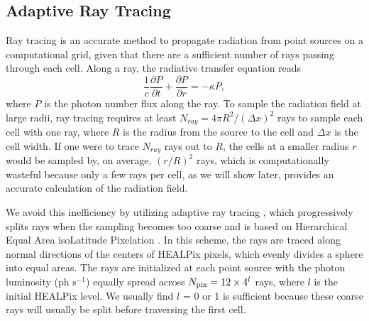 \documentclass[useAMS,usenatbib]{mn2e}
\begin{document}


\subsection{Adaptive Ray Tracing}
\label{sec:ART}

Ray tracing is an accurate method to propagate radiation from point
sources on a computational grid, given that there are a sufficient
number of rays passing through each cell.  Along a ray, the radiative
transfer equation reads
%
\begin{equation}
\label{eqn:rtray}
\frac{1}{c} \frac{\partial P}{\partial t} + \frac{\partial P}{\partial
  r} = -\kappa P,
\end{equation}
%
where $P$ is the photon number flux along the ray.  To sample the
radiation field at large radii, ray tracing requires at least $N_{ray}
= 4\pi R^2 / (\Delta x)^2$ rays to sample each cell with one ray,
where $R$ is the radius from the source to the cell and $\Delta x$ is
the cell width.  If one were to trace $N_{ray}$ rays out to $R$, the
cells at a smaller radius $r$ would be sampled by, on average,
$(r/R)^2$ rays, which is computationally wasteful because only a few
rays per cell, as we will show later, provides an accurate calculation
of the radiation field.

We avoid this inefficiency by utilizing adaptive ray tracing
\citep{Abel02_RT}, which progressively splits rays when the sampling
becomes too coarse and is based on Hierarchical Equal Area isoLatitude
Pixelation \citep[HEALPix;][]{HEALPix}.  In this scheme, the rays are
traced along normal directions of the centers of HEALPix pixels, which
evenly divides a sphere into equal areas.  The rays are initialized at
each point source with the photon luminosity (ph s$^{-1}$) equally
spread across $N_{\rm pix} = 12 \times 4^l$ rays, where $l$ is the
initial HEALPix level.  We usually find $l$ = 0 or 1 is sufficient
because these coarse rays will usually be split before traversing
the first cell.
\end{document}
